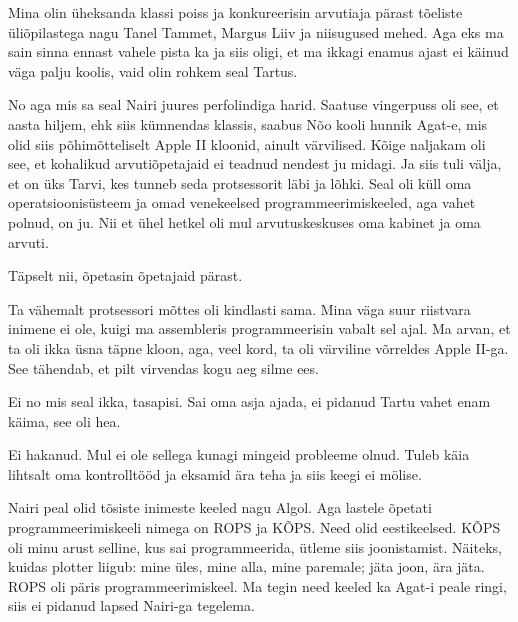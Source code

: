 Mina olin üheksanda klassi poiss ja konkureerisin  arvutiaja pärast tõeliste 
üliõpilastega nagu Tanel Tammet, Margus 
Liiv ja niisugused mehed. Aga eks ma sain sinna ennast 
vahele pista ka ja siis oligi, et ma ikkagi enamus ajast ei käinud väga palju 
koolis, vaid olin rohkem seal Tartus.


No aga mis sa seal Nairi juures perfolindiga harid. Saatuse vingerpuss oli see, 
et aasta hiljem, ehk siis kümnendas klassis, saabus Nõo kooli hunnik 
Agat-e, mis olid siis põhimõtteliselt Apple II  kloonid,  
ainult värvilised. Kõige naljakam oli see, et  kohalikud arvutiõpetajaid  ei 
teadnud nendest ju midagi. Ja siis tuli välja, et on üks Tarvi, kes tunneb seda 
protsessorit  läbi ja lõhki. Seal oli küll oma operatsioonisüsteem ja omad 
venekeelsed programmeerimiskeeled, aga vahet polnud, on ju. Nii et ühel hetkel 
oli mul arvutuskeskuses oma  kabinet ja oma arvuti. 


Täpselt nii, õpetasin õpetajaid pärast. 


Ta vähemalt protsessori mõttes oli kindlasti sama. Mina väga suur riistvara 
inimene ei ole,  kuigi ma assembleris programmeerisin 
vabalt sel ajal. Ma arvan, et ta oli ikka üsna täpne kloon, aga, veel kord, ta 
oli värviline võrreldes Apple II-ga. See tähendab, et pilt virvendas kogu aeg 
silme ees.  


Ei no mis seal ikka,  tasapisi. Sai  oma asja ajada, ei pidanud Tartu vahet 
enam käima, see oli hea.


Ei hakanud. Mul ei ole sellega kunagi mingeid probleeme olnud. Tuleb käia 
lihtsalt oma kontrolltööd ja eksamid ära teha ja siis keegi ei mölise.

Nairi peal olid tõsiste inimeste keeled nagu Algol. Aga 
lastele õpetati programmeerimiskeeli nimega on ROPS ja 
KÕPS. Need olid eestikeelsed. KÕPS oli minu arust selline, 
kus sai programmeerida, ütleme siis joonistamist. Näiteks, kuidas plotter 
liigub: mine üles, mine alla, mine paremale; jäta joon, ära jäta.  ROPS oli 
päris programmeerimiskeel. Ma tegin need keeled ka Agat-i peale ringi, siis ei 
pidanud lapsed Nairi-ga tegelema. 

